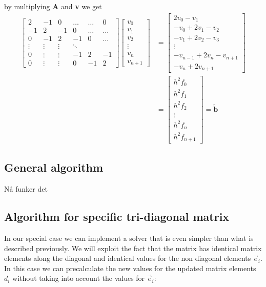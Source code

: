 \documentclass[norsk,a4paper,12pt]{article}
\begin{document}
by multiplying \textbf{A} and \textbf{v} we get \\
\begin{align*}
\begin{bmatrix} 2 & -1 & 0 & \dots & \dots & 0 \\ -1 & 2 & -1 & 0 & \dots & \dots \\ 0 & -1 & 2 & -1 & 0 & \dots \\ \vdots & \vdots & \vdots & \ddots \\ 0 & \vdots & \vdots & -1 & 2 & -1 \\ 0 & \vdots & \vdots & 0 & -1 & 2  \end{bmatrix}
\begin{bmatrix} v_0 \\ v_1\\ v_2\\ \vdots \\ v_n \\ v_{n+1} \end{bmatrix}&=\begin{bmatrix} 2v_0 - v_1 \\ -v_0+2v_1-v_2 \\ -v_1+2v_2-v_3 \\ \vdots \\ -v_{n-1}+2v_n-v_{n+1} \\ -v_n+2v_{n+1}
\end{bmatrix}\\&=
\begin{bmatrix}h^2f_0 \\ h^2f_1\\ h^2f_2\\ \vdots \\ h^2f_n\\ h^2f_{n+1}\end{bmatrix} = \widetilde{\textbf{b}}
\end{align*}

\subsection{General algorithm}

Nå funker det
\\
\subsection{Algorithm for specific tri-diagonal matrix}

In our special case we can implement a solver that is even simpler than what is described previously.  We will exploit the fact that the matrix has identical matrix elements along the diagonal and identical values for the non diagonal elements $\vec{e}_i$. In this case we can precalculate the new values for the updated matrix elements $d_i$ without taking into account the values for $\vec{e}_i$:
\end{document}
